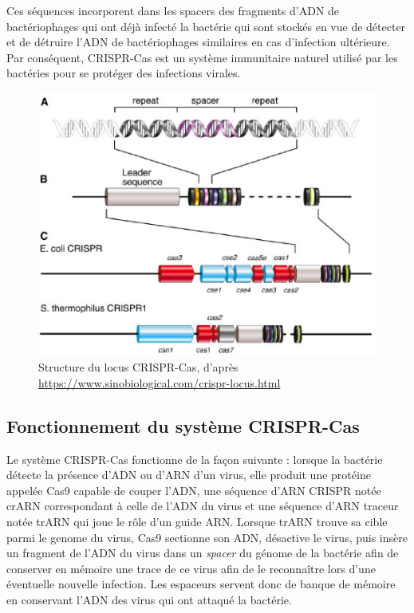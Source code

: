 \documentclass[twoside,a4paper,11pt,frenchb,openany]{report}
\begin{document}
Ces séquences incorporent dans les spacers des fragments d'ADN de bactériophages qui ont déjà infecté la bactérie qui sont stockés en vue de détecter et de détruire l'ADN de bactériophages similaires en cas d'infection ultérieure. Par conséquent, CRISPR-Cas est un système immunitaire naturel utilisé par les bactéries pour se protéger des infections virales. 

\begin{figure}
\centering
\includegraphics[scale=0.6]{crispr.png}
\caption{Structure du locus CRISPR-Cas, d'après\\ \url{https://www.sinobiological.com/crispr-locus.html}}
\end{figure}


\subsection{Fonctionnement du système CRISPR-Cas}

Le système CRISPR-Cas fonctionne de la façon suivante : lorsque la bactérie détecte la présence d'ADN ou d'ARN d'un virus, elle produit une protéine appelée Cas9 capable de couper l'ADN, une séquence d'ARN CRISPR notée crARN correspondant à celle de l'ADN du virus et une séquence d'ARN traceur notée trARN qui joue le rôle d'un guide ARN. Lorsque trARN trouve sa cible parmi le genome du virus, Cas9 sectionne son ADN, désactive le virus, puis insère un fragment de l'ADN du virus dans un \textit{spacer} du génome de la bactérie afin de conserver en mémoire une trace de ce virus afin de le reconnaître lors d'une éventuelle nouvelle infection. Les espaceurs servent donc de banque de mémoire en conservant l'ADN des virus qui ont attaqué la bactérie.
\end{document}
